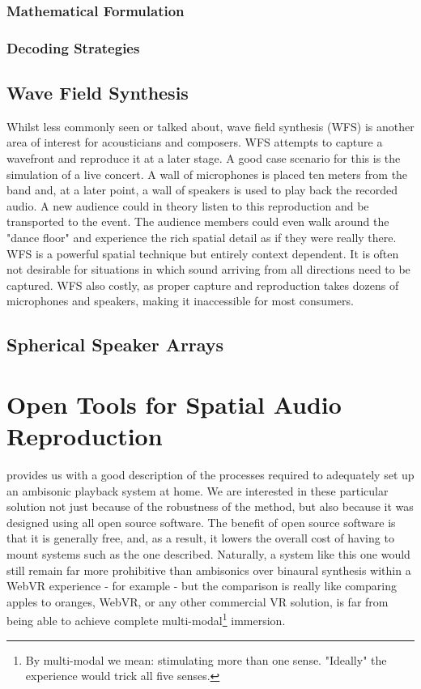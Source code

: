 \subsubsection{Mathematical Formulation}

\subsubsection{Decoding Strategies}

\subsection{Wave Field Synthesis}
\label{subsec:wfs}

Whilst less commonly seen or talked about, wave field synthesis (WFS) is another area of interest for acousticians and composers. WFS attempts to capture a wavefront and reproduce it at a later stage. A good case scenario for this is the simulation of a live concert. A wall of microphones is placed ten meters from the band and, at a later point, a wall of speakers is used to play back the recorded audio. A new audience could in theory listen to this reproduction and be transported to the event. The audience members could even walk around the "dance floor" and experience the rich spatial detail as if they were really there. WFS is a powerful spatial technique but entirely context dependent. It is often not desirable for situations in which sound arriving from all directions need to be captured. WFS also costly, as proper capture and reproduction takes dozens of microphones and speakers, making it inaccessible for most consumers.


\subsection{Spherical Speaker Arrays}


\section{Open Tools for Spatial Audio Reproduction}


\cite{nettingsmeier2008ambi} provides us with a good description of the processes required to adequately set up an ambisonic playback system at home. We are interested in these particular solution not just because of the robustness of the method, but also because it was designed using all open source software. The benefit of open source software is that it is generally free, and, as a result, it lowers the overall cost of having to mount systems such as the one described. Naturally, a system like this one would still remain far more prohibitive than ambisonics over binaural synthesis within a WebVR experience - for example - but the comparison is really like comparing apples to oranges, WebVR, or any other commercial VR solution, is far from being able to achieve complete multi-modal\footnote{By multi-modal we mean: stimulating more than one sense. "Ideally" the experience would trick all five senses.} immersion.

